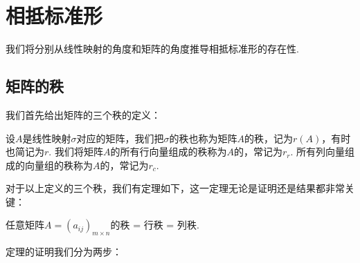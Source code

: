 \chapter{相抵标准形}

我们将分别从线性映射的角度和矩阵的角度推导相抵标准形的存在性.

\section{矩阵的秩}

我们首先给出矩阵的三个秩的定义：
\begin{definition}{}{}
    设$A$是线性映射$\sigma$对应的矩阵，我们把$\sigma$的秩也称为矩阵$A$的秩，记为$r(A)$，有时也简记为$r$. 我们将矩阵$A$的所有行向量组成的秩称为$A$的，常记为$r_r$. 所有列向量组成的向量组的秩称为$A$的，常记为$r_c$.
\end{definition}
对于以上定义的三个秩，我们有定理如下，这一定理无论是证明还是结果都非常关键：
\begin{theorem}{}{}
    任意矩阵$A=(a_{ij})_{m\times n}$的秩 = 行秩 = 列秩.
\end{theorem}
定理的证明我们分为两步：
